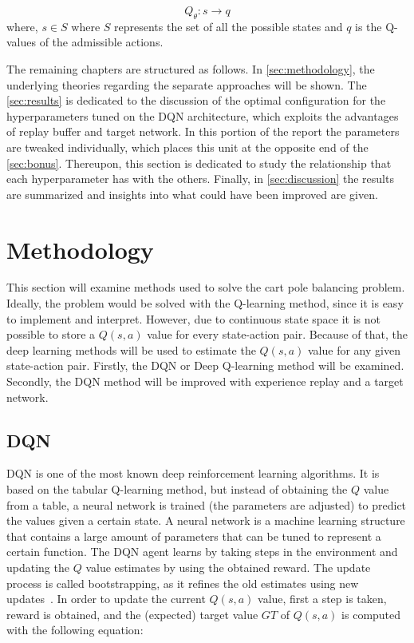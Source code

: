 \documentclass{article}
\begin{document}
\begin{equation}
    Q_{\theta} :  s \rightarrow q
    \label{eq:value-based-approach}
\end{equation}
where, $s \in S$ where $S$ represents the set of all the possible states and $q$ is the Q-values of the admissible actions.


The remaining chapters are structured as follows.
In \autoref{sec:methodology}, the underlying theories regarding the separate approaches will be shown.
The \autoref{sec:results} is dedicated to the discussion of the optimal configuration for the hyperparameters tuned on the DQN architecture, which exploits the advantages of replay buffer and target network.
In this portion of the report the parameters are tweaked individually, which places this unit at the opposite end of the \autoref{sec:bonus}.
Thereupon, this section is dedicated to study the relationship that each hyperparameter has with the others.
Finally, in \autoref{sec:discussion} the results are summarized and insights into what could have been improved are given.


\section{Methodology}
\label{sec:methodology}
This section will examine methods used to solve the cart pole balancing problem.
Ideally, the problem would be solved with the Q-learning method, since it is easy to implement and interpret.
However, due to continuous state space it is not possible to store a $Q(s,a)$ value for every state-action pair.
Because of that, the deep learning methods will be used to estimate the $Q(s,a)$ value for any given state-action pair.
Firstly, the DQN or Deep Q-learning method will be examined.
Secondly, the DQN method will be improved with experience replay and a target network.

\subsection{DQN}
\label{subsec:dqn}
DQN is one of the most known deep reinforcement learning algorithms.
It is based on the tabular Q-learning method, but instead of obtaining the $Q$ value from a table,
a neural network is trained (the parameters are adjusted) to predict the values given a certain state.
A neural network is a machine learning structure that contains a large amount of parameters that can be tuned
to represent a certain function.
The DQN agent learns by taking steps in the environment and updating the $Q$ value estimates by using the obtained reward.
The update process is called bootstrapping, as it refines the old estimates using new updates~\cite{DBLP:books/sp/Plaat22}.
In order to update the current $Q(s,a)$ value, first a step is taken, reward is obtained, and the (expected)
target value $GT$ of $Q(s,a)$ is computed with the following equation:
\end{document}
